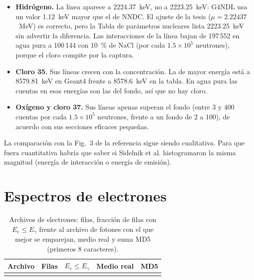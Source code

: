 \documentclass[11pt,a4paper]{article}
\newcommand{\tablas}{tablas}
\begin{document}
\begin{itemize}
  \item \textbf{Hidrógeno.} La línea aparece a 2224.37~keV, no a 2223.25~keV: G4NDL usa un valor 1.12~keV mayor que el de NNDC. El ajuste de la tesis ($\mu=2.22437$~MeV) es correcto, pero la Tabla de parámetros nucleares lista 2223.25~keV sin advertir la diferencia. Las interacciones de la línea bajan de 197\,552 en agua pura a 100\,144 con 10~\% de NaCl (por cada $1.5\times10^5$ neutrones), porque el cloro compite por la captura.
  \item \textbf{Cloro 35.} Sus líneas crecen con la concentración. La de mayor energía está a 8579.81~keV en Geant4 frente a 8578.6~keV en la tabla. En agua pura las cuentas en esas energías son las del fondo, así que no hay cloro.
  \item \textbf{Oxígeno y cloro 37.} Sus líneas apenas superan el fondo (entre 3 y 400 cuentas por cada $1.5\times10^5$ neutrones, frente a un fondo de 2 a 100), de acuerdo con sus secciones eficaces pequeñas.
\end{itemize}

La comparación con la Fig.~3 de la referencia sigue siendo cualitativa. Para que fuera cuantitativa habría que saber si Sidelnik et al. histogramaron la misma magnitud (energía de interacción o energía de emisión).

\section{Espectros de electrones}
\label{sec:electrones}

\begin{table}[H]
\centering\small
\caption{Archivos de electrones: filas, fracción de filas con $E_e\leq E_\gamma$ frente al archivo de fotones con el que mejor se emparejan, medio real y suma MD5 (primeros 8 caracteres).}
\label{tab:archivos}
\begin{tabular}{@{}lrrll@{}}
\toprule
Archivo & Filas & $E_e\leq E_\gamma$ & Medio real & MD5 \\
\midrule
 \\
\bottomrule
\end{tabular}
\end{table}
\end{document}
